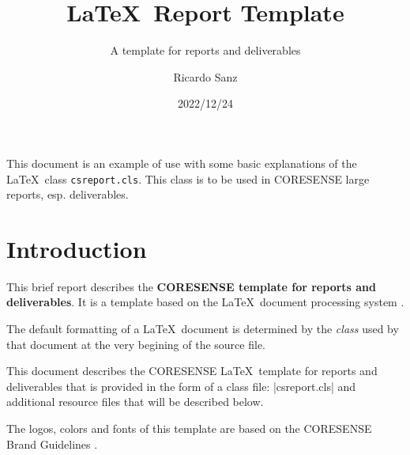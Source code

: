 \documentclass{csreport}
\begin{document}

\title{\LaTeX\ Report Template}
\subtitle{A template for reports and deliverables}
\author{Ricardo Sanz}
\date{2022/12/24}

\greencover
\maketitle

\executivesummary

This document is an example of use with some basic explanations of the \LaTeX\ class \texttt{csreport.cls}. This class is to be used in CORESENSE large reports, esp. deliverables.

\documentversions
{}

\tableofcontents



\chapter{Introduction}

This brief report describes the \textbf{CORESENSE template for reports and deliverables}. It is a template based on the \LaTeX\ document processing system \cite{Lamport-1986}.

The default formatting of a \LaTeX\ document is determined by the \emph{class} used by that document at the very begining of the source file. 

This document describes the CORESENSE \LaTeX\ template for reports and deliverables that is provided in the form of a class file: \code|csreport.cls| and additional resource files that will be described below.

The logos, colors and fonts of this template are based on the CORESENSE Brand Guidelines \cite{CORESENSE-017}.

\vfill

\end{document}
